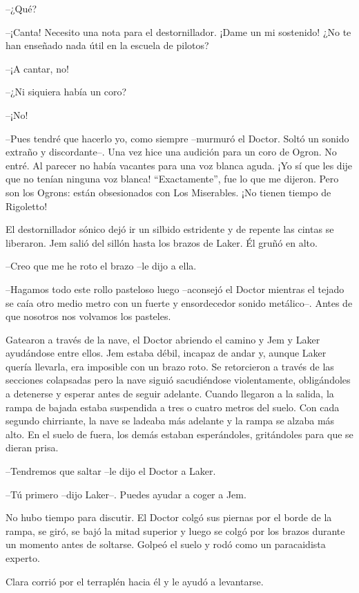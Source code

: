 {--¿Qué?}

{--¡Canta! Necesito una nota para el destornillador. ¡Dame un mi
sostenido! ¿No te han enseñado nada útil en la escuela de pilotos?}

{--¡A cantar, no!}

{--¿Ni siquiera había un coro?}

{--¡No!}

{--Pues tendré que hacerlo yo, como siempre --murmuró el Doctor. Soltó un
 sonido extraño y discordante--. Una vez hice una audición para un coro
 de Ogron. No entré. Al parecer no había vacantes para una voz blanca
 aguda. ¡Yo sí que les dije que no tenían ninguna voz blanca!
 ``Exactamente'', fue lo que me dijeron. Pero son los Ogrons: están
obsesionados con Los Miserables. ¡No tienen tiempo de Rigoletto!}

{El destornillador sónico dejó ir un silbido estridente y de repente las
 cintas se liberaron. Jem salió del sillón hasta los brazos de Laker. Él
gruñó en alto.}

{--Creo que me he roto el brazo --le dijo a ella.}

{--Hagamos todo este rollo pasteloso luego --aconsejó el Doctor mientras
 el tejado se caía otro medio metro con un fuerte y ensordecedor sonido
metálico--. Antes de que nosotros nos volvamos los pasteles.}

{Gatearon a través de la nave, el Doctor abriendo el camino y Jem y Laker
 ayudándose entre ellos. Jem estaba débil, incapaz de andar y, aunque
 Laker quería llevarla, era imposible con un brazo roto. Se retorcieron a
 través de las secciones colapsadas pero la nave siguió sacudiéndose
 violentamente, obligándoles a detenerse y esperar antes de seguir
 adelante. Cuando llegaron a la salida, la rampa de bajada estaba
 suspendida a tres o cuatro metros del suelo. Con cada segundo
 chirriante, la nave se ladeaba más adelante y la rampa se alzaba más
 alto. En el suelo de fuera, los demás estaban esperándoles, gritándoles
para que se dieran prisa.}

{--Tendremos que saltar --le dijo el Doctor a Laker.}

{--Tú primero --dijo Laker--. Puedes ayudar a coger a Jem.}

{No hubo tiempo para discutir. El Doctor colgó sus piernas por el borde
 de la rampa, se giró, se bajó la mitad superior y luego se colgó por los
 brazos durante un momento antes de soltarse. Golpeó el suelo y rodó como
un paracaidista experto.}

{Clara corrió por el terraplén hacia él y le ayudó a levantarse.}

